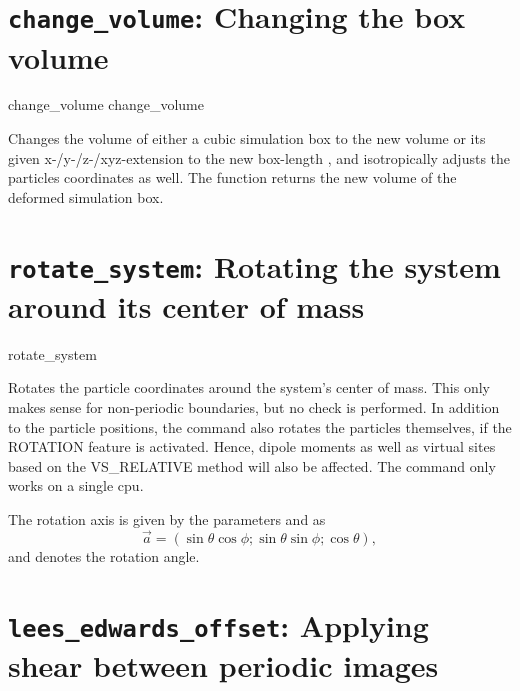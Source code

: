 \section{\texttt{change_volume}: Changing the box volume}

\begin{essyntax}
   change_volume  
   change_volume  
\end{essyntax}
Changes the volume of either a cubic simulation box to the new volume
 or its given x-/y-/z-/xyz-extension to the new
box-length , and isotropically adjusts the
particles coordinates as well. The function returns the new volume of
the deformed simulation box.

\section{\texttt{rotate_system}: Rotating the system around its center of mass}

\begin{essyntax}
   rotate_system   
\end{essyntax}

Rotates the particle coordinates around the system's center of mass. This only makes sense for non-periodic boundaries, but no check is performed. 
In addition to the particle positions, the command also rotates the particles themselves, if the ROTATION feature is activated. Hence, dipole moments as well as virtual sites based on the VS\_RELATIVE method will also be affected.
The command only works on a single cpu.

The rotation axis is given by the parameters  and  as
\begin{equation}
\vec{a} = (\sin \theta \cos \phi ; \sin \theta \sin \phi ; \cos \theta),
\end{equation}
and  denotes the rotation angle.


\section{\texttt{lees_edwards_offset}: Applying shear between periodic images}
\label{sec:lees-edwards}


